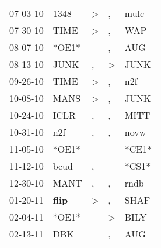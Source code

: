 \begin{supertabular}{p{0.07\textwidth}p{0.06\textwidth}p{0.02\textwidth}p{0.02\textwidth}p{0.06\textwidth}}
          07-03-10\textsuperscript{} &           1348\textsuperscript{} &     \textgreater &                , &           mulc\textsuperscript{} \\
          07-30-10\textsuperscript{} &           TIME\textsuperscript{} &     \textgreater &                , &            WAP\textsuperscript{} \\
          08-07-10\textsuperscript{} &                            *OE1* &                  &                , &            AUG\textsuperscript{} \\
          08-13-10\textsuperscript{} &           JUNK\textsuperscript{} &                , &     \textgreater &           JUNK\textsuperscript{} \\
          09-26-10\textsuperscript{} &           TIME\textsuperscript{} &     \textgreater &                , &            n2f\textsuperscript{} \\
          10-08-10\textsuperscript{} &           MANS\textsuperscript{} &     \textgreater &                , &           JUNK\textsuperscript{} \\
          10-24-10\textsuperscript{} &           ICLR\textsuperscript{} &                , &                , &           MITT\textsuperscript{} \\
          10-31-10\textsuperscript{} &            n2f\textsuperscript{} &                , &                , &           novw\textsuperscript{} \\
          11-05-10\textsuperscript{} &                            *OE1* &                  &                  &                            *CE1* \\
          11-12-10\textsuperscript{} &           bcud\textsuperscript{} &                , &                  &                            *CS1* \\
          12-30-10\textsuperscript{} &           MANT\textsuperscript{} &                , &                , &           rndb\textsuperscript{} \\
          01-20-11\textsuperscript{} &  \textbf{flip\textsuperscript{}} &     \textgreater &                , &           SHAF\textsuperscript{} \\
          02-04-11\textsuperscript{} &                            *OE1* &                  &     \textgreater &           BILY\textsuperscript{} \\
          02-13-11\textsuperscript{} &            DBK\textsuperscript{} &                  &                , &            AUG\textsuperscript{} \\

\end{supertabular}
